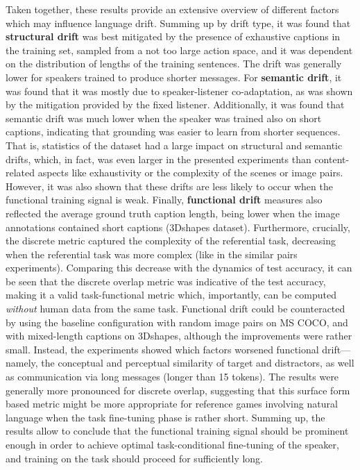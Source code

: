 Taken together, these results provide an extensive overview of different factors which may influence language drift. Summing up by drift type, it was found that \textbf{structural drift} was best mitigated by the presence of exhaustive captions in the training set, sampled from a not too large action space, and it was dependent on the distribution of lengths of the training sentences. The drift was generally lower for speakers trained to produce shorter messages. For \textbf{semantic drift}, it was found that it was mostly due to speaker-listener co-adaptation, as was shown by the mitigation provided by the fixed listener. Additionally, it was found that semantic drift was much lower when the speaker was trained also on short captions, indicating that grounding was easier to learn from shorter sequences. That is, statistics of the dataset had a large impact on structural and semantic drifts, which, in fact, was even larger in the presented experiments than content-related aspects like exhaustivity or the complexity of the scenes or image pairs. However, it was also shown that these drifts are less likely to occur when the functional training signal is weak. Finally, \textbf{functional drift} measures also reflected the average ground truth caption length, being lower when the image annotations contained short captions (3Dshapes dataset). Furthermore, crucially, the discrete metric captured the complexity of the referential task, decreasing when the referential task was more complex (like in the similar pairs experiments).
Comparing this decrease with the dynamics of test accuracy, it can be seen that the discrete overlap metric was indicative of the test accuracy, making it a valid task-functional metric which, importantly, can be computed \emph{without} human data from the same task. Functional drift could be counteracted by using the baseline configuration with random image pairs on MS COCO, and with mixed-length captions on 3Dshapes, although the improvements were rather small. Instead, the experiments showed which factors worsened functional drift---namely, the conceptual and perceptual similarity of target and distractors, as well as communication via long messages (longer than 15 tokens). The results were generally more pronounced for discrete overlap, suggesting that this surface form based metric might be more appropriate for reference games involving natural language when the task fine-tuning phase is rather short. 
Summing up, the results allow to conclude that the functional training signal should be prominent enough in order to achieve optimal task-conditional fine-tuning of the speaker, and training on the task should proceed for sufficiently long.

